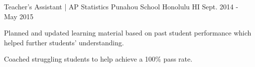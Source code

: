 \begin{cventries}
  \cventry
    {Teacher's Assistant | AP Statistics} %
    {Punahou School} %
    {Honolulu HI} %
    {Sept. 2014 - May 2015} %
    {
      \begin{cvitems} %
        \item {Planned and updated learning material based on past student performance which helped further students' understanding.}
        \item {Coached struggling students to help achieve a 100\% pass rate.}
      \end{cvitems}
    }
    
\end{cventries}
